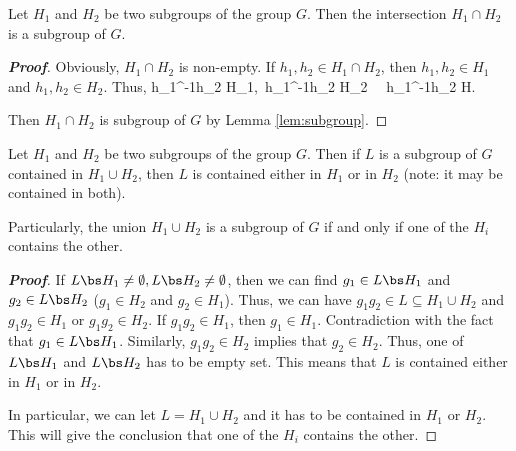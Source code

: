 \begin{proposition}
Let $H_1$ and $H_2$ be two subgroups of the group $G$. Then the intersection $H_1 \cap H_2$ is a subgroup of $G$.
\end{proposition}

\begin{proof}[\bf Proof]
Obviously, $H_1\cap H_2$ is non-empty. If $h_1,h_2\in H_1\cap H_2$, then $h_1,h_2\in H_1$ and $h_1,h_2\in H_2$. Thus,
\be
h_1^{-1}h_2 \in H_1,\ h_1^{-1}h_2 \in H_2 \ \ra \ h_1^{-1}h_2 \in H.
\ee

Then $H_1\cap H_2$ is subgroup of $G$ by Lemma \ref{lem:subgroup}.
\end{proof}

\begin{proposition}
Let $H_1$ and $H_2$ be two subgroups of the group $G$. Then if $L$ is a subgroup of $G$ contained in $H_1 \cup H_2$, then $L$ is contained either in $H_1$ or in $H_2$ (note: it may be contained in both).

Particularly, the union $H_1 \cup H_2$ is a subgroup of $G$ if and only if one of the $H_i$ contains the other.
\end{proposition}

\begin{proof}[\bf Proof]
If $L\bs H_1 \neq \emptyset, L\bs H_2\neq \emptyset$, then we can find $g_1 \in L\bs H_1$ and $g_2 \in L\bs H_2$ ($g_1\in H_2$ and $g_2\in H_1$). Thus, we can have $g_1g_2 \in L\subseteq H_1\cup H_2$ and $g_1g_2 \in H_1$ or $g_1g_2 \in H_2$. If $g_1g_2\in H_1$, then $g_1\in H_1$. Contradiction with the fact that $g_1 \in L\bs H_1$. Similarly, $g_1g_2\in H_2$ implies that $g_2\in H_2$. Thus, one of $L\bs H_1$ and $L\bs H_2$ has to be empty set. This means that $L$ is contained either in $H_1$ or in $H_2$.

In particular, we can let $L = H_1\cup H_2$ and it has to be contained in $H_1$ or $H_2$. This will give the conclusion that one of the $H_i$ contains the other.%
\end{proof}



